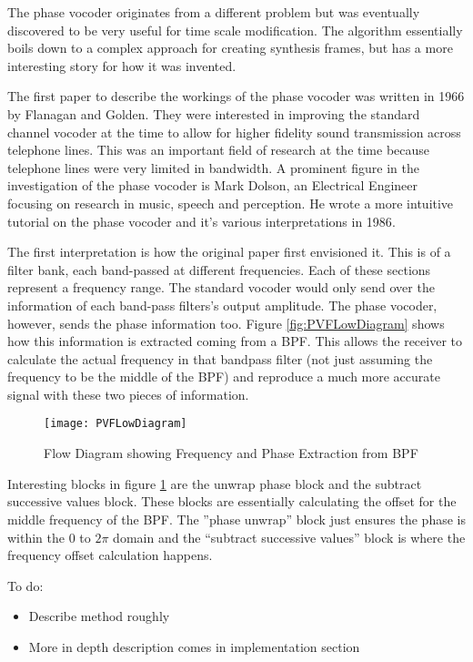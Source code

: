 The phase vocoder originates from a different problem but was eventually
discovered to be very useful for time scale modification. The algorithm
essentially boils down to a complex approach for creating synthesis frames, but
has a more interesting story for how it was invented.

The first paper to describe the workings of the phase vocoder was written in 1966
by Flanagan and Golden\cite{OriginalPhaseVocoder}. They were interested in
improving the standard channel vocoder at the time to allow for higher fidelity
sound transmission across telephone lines. This was an important field of research
at the time because telephone lines were very limited in bandwidth. A prominent
figure in the investigation of the phase vocoder is Mark Dolson, an Electrical
Engineer focusing on research in music, speech and perception. He wrote a more
intuitive tutorial on the phase vocoder and it's various interpretations in
1986\cite{DolsonTutorial}.

The first interpretation is how the original paper first envisioned it. This is of
a filter bank, each band-passed at different frequencies. Each of these sections
represent a frequency range. The standard vocoder would only send over the
information of each band-pass filters's output amplitude. The phase vocoder,
however, sends the phase information too. Figure \ref{fig:PVFLowDiagram} shows how
this information is extracted coming from a BPF. This allows the receiver to
calculate the actual frequency in that bandpass filter (not just assuming the
frequency to be the middle of the BPF) and reproduce a much more accurate signal
with these two pieces of information.

\begin{figure}[h]
\texttt{[image: PVFLowDiagram]}
\caption{Flow Diagram showing Frequency and Phase Extraction from
BPF\cite{OriginalPhaseVocoder}}
\label{fig:AutocorrelationFlowDiagram}
\end{figure}

Interesting blocks in figure \ref{fig:AutocorrelationFlowDiagram} are the unwrap
phase block and the subtract successive values block. These blocks are essentially
calculating the offset for the middle frequency of the BPF. The ''phase unwrap''
block just ensures the phase is within the 0 to $2\pi$ domain and the ``subtract
successive values'' block is where the frequency offset calculation happens.

\color{red}
To do:
\begin{itemize}
	\item Describe method roughly
	\item More in depth description comes in implementation section
\end{itemize}
\color{black}
